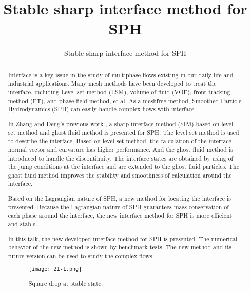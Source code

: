 \documentclass[10pt]{article}
\title{Stable sharp interface method for SPH}
\date{}
\author[$\relax$]{Stable sharp interface method for SPH}
\affil[$\relax$]{Institute of Applied Physics and Computational Mathematics, Beijing, China}
\affil[$\relax$]{\href{mailto:zhang_mingyu@iapcm.ac.cn}{zhang\_mingyu@iapcm.ac.cn}}
\begin{document}
\maketitle


\begin{abstract}
Interface is a key issue in the study of multiphase flows existing in our daily life and industrial applications. Many mesh methods have been developed to treat the interface, including Level set method (LSM), volume of fluid (VOF), front tracking method (FT), and phase field method, et al. As a meshfree method, Smoothed Particle Hydrodynamics (SPH) can easily handle complex flows with interface.

In Zhang and Deng's previous work \cite{zhang2015sharp}, a sharp interface method (SIM) based on level set method and ghost fluid method is presented for SPH. The level set method is used to describe the interface. Based on level set method, the calculation of the interface normal vector and curvature has higher performance. And the ghost fluid method is introduced to handle the discontinuity. The interface states are obtained by using of the jump conditions at the interface and are extended to the ghost fluid particles. The ghost fluid method improves the stability and smoothness of calculation around the interface.

Based on the Lagrangian nature of SPH, a new method for locating the interface is presented. Because the Lagrangian nature of SPH guarantees mass conservation of each phase around the interface, the new interface method for SPH is more efficient and stable.

In this talk, the new developed interface method for SPH is presented. The numerical behavior of the new method is shown by benchmark tests. The new method and its future version can be used to study the complex flows.

\begin{figure}[!htb]
\centering
\texttt{[image: 21-1.png]}
\caption{Square drop at stable state.}\label{fig:21}
\end{figure}

\end{abstract}



\addbib
\end{document}
